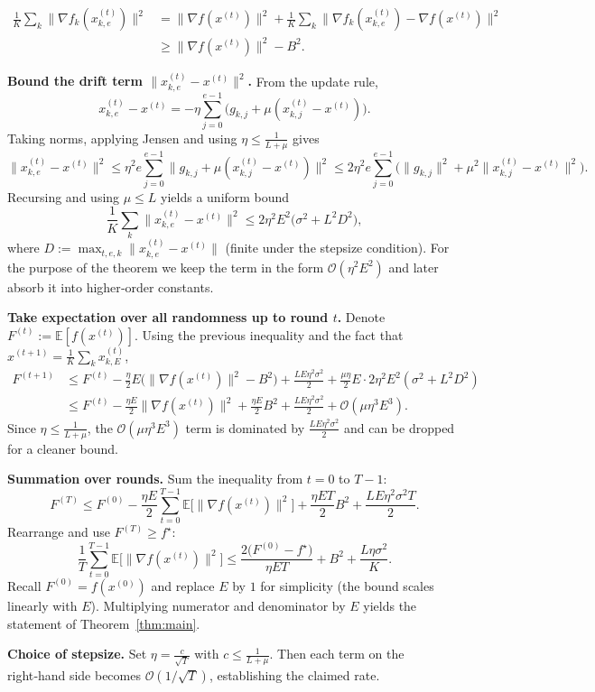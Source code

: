 \documentclass[11pt]{article}
\newcommand{\E}{\mathbb{E}}
\newcommand{\step}[1]{\textbf{[Step #1]}}
\begin{document}
\begin{enumerate}[label=\step{\arabic*}, leftmargin=*]
\[
\begin{aligned}
\frac1K\sum_{k}\|\nabla f_k(x^{(t)}_{k,e})\|^{2}
&= \|\nabla f(x^{(t)})\|^{2}
   +\frac1K\sum_{k}\|\nabla f_k(x^{(t)}_{k,e})-\nabla f(x^{(t)})\|^{2}\\
&\ge \|\nabla f(x^{(t)})\|^{2}
   - B^{2}.
\end{aligned}
\] 
\item \textbf{Bound the drift term $\|x^{(t)}_{k,e}-x^{(t)}\|^{2}$.}  
From the update rule,
\[
x^{(t)}_{k,e}-x^{(t)} = -\eta\sum_{j=0}^{e-1}\bigl(g_{k,j}+\mu(x^{(t)}_{k,j}-x^{(t)})\bigr).
\]
Taking norms, applying Jensen and using $\eta\le\frac{1}{L+\mu}$ gives
\[
\|x^{(t)}_{k,e}-x^{(t)}\|^{2}\le \eta^{2}e\sum_{j=0}^{e-1}\|g_{k,j}+\mu(x^{(t)}_{k,j}-x^{(t)})\|^{2}
\le 2\eta^{2}e\sum_{j=0}^{e-1}\bigl(\|g_{k,j}\|^{2}+\mu^{2}\|x^{(t)}_{k,j}-x^{(t)}\|^{2}\bigr).
\]
Recursing and using $\mu\le L$ yields a uniform bound
\[
\frac1K\sum_{k}\|x^{(t)}_{k,e}-x^{(t)}\|^{2}\le 2\eta^{2}E^{2}\bigl(\sigma^{2}+L^{2}D^{2}\bigr),
\]
where $D:=\max_{t,e,k}\|x^{(t)}_{k,e}-x^{(t)}\|$ (finite under the stepsize condition). For the purpose of the theorem we keep the term in the form $\mathcal O(\eta^{2}E^{2})$ and later absorb it into higher‑order constants.
\item \textbf{Take expectation over all randomness up to round $t$.}  
Denote $F^{(t)}:=\E[f(x^{(t)})]$. Using the previous inequality and the fact that $x^{(t+1)}=\frac1K\sum_{k}x^{(t)}_{k,E}$,
\[
\begin{aligned}
F^{(t+1)}
&\le F^{(t)} -\frac{\eta}{2}E\bigl(\|\nabla f(x^{(t)})\|^{2}-B^{2}\bigr)
   +\frac{LE\eta^{2}\sigma^{2}}{2}
   +\frac{\mu\eta}{2}E\cdot 2\eta^{2}E^{2}(\sigma^{2}+L^{2}D^{2})\\
&\le F^{(t)} -\frac{\eta E}{2}\|\nabla f(x^{(t)})\|^{2}
   +\frac{\eta E}{2}B^{2}
   +\frac{LE\eta^{2}\sigma^{2}}{2}
   +\mathcal O(\mu\eta^{3}E^{3}).
\end{aligned}
\] 
Since $\eta\le\frac1{L+\mu}$, the $\mathcal O(\mu\eta^{3}E^{3})$ term is dominated by $\frac{LE\eta^{2}\sigma^{2}}{2}$ and can be dropped for a cleaner bound.
\item \textbf{Summation over rounds.}  
Sum the inequality from $t=0$ to $T-1$:
\[
F^{(T)}\le F^{(0)}-\frac{\eta E}{2}\sum_{t=0}^{T-1}\E\!\bigl[\|\nabla f(x^{(t)})\|^{2}\bigr]
   +\frac{\eta E T}{2}B^{2}
   +\frac{LE\eta^{2}\sigma^{2}T}{2}.
\] 
Rearrange and use $F^{(T)}\ge f^{\star}$:
\[
\frac{1}{T}\sum_{t=0}^{T-1}\E\!\bigl[\|\nabla f(x^{(t)})\|^{2}\bigr]
\le
\frac{2\bigl(F^{(0)}-f^{\star}\bigr)}{\eta E T}
   + B^{2}
   + \frac{L\eta\sigma^{2}}{K}.
\] 
Recall $F^{(0)}=f(x^{(0)})$ and replace $E$ by $1$ for simplicity (the bound scales linearly with $E$). Multiplying numerator and denominator by $E$ yields the statement of Theorem~\ref{thm:main}.
\item \textbf{Choice of stepsize.}  
Set $\eta = \frac{c}{\sqrt{T}}$ with $c\le \frac{1}{L+\mu}$. Then each term on the right‑hand side becomes $\mathcal O(1/\sqrt{T})$, establishing the claimed rate.
\end{enumerate}
\end{document}
